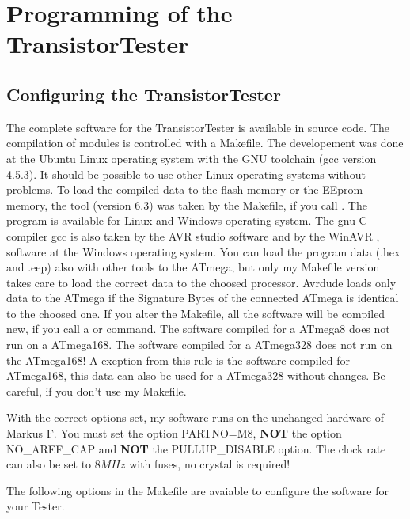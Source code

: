 \chapter{Programming of the TransistorTester}
\section{Configuring the TransistorTester}
\label{sec:config}
The complete software for the TransistorTester is available in source code.
The compilation of modules is controlled with a Makefile. The developement was done
at the Ubuntu Linux operating system with the GNU toolchain (gcc version 4.5.3).
It should be possible to use other Linux operating systems without problems.
To load the compiled data to the flash memory or
the EEprom memory, the tool  (version 6.3) was taken by the Makefile, if you call .
 The program  \cite{avrdude} is available for Linux and Windows operating system.
The gnu C-compiler gcc is also taken by the AVR studio software and
by the WinAVR \cite{winavr1},\cite{winavr2} software at the Windows operating system.
You can load the program data (.hex and .eep) also with other tools to the ATmega,
but only my Makefile version takes care to load the correct data to the choosed processor.
Avrdude loads only data to the ATmega if the Signature Bytes of the connected ATmega is
identical to the choosed one. 
If you alter the Makefile, all the software will be compiled new, if you call a  or
 command. The software compiled for a ATmega8 does not run on a ATmega168.
The software compiled for a ATmega328 does not run on the ATmega168! 
A exeption from this rule is the software compiled for ATmega168, this data can also be used
for a ATmega328 without changes.
Be careful, if you don't use my Makefile.

With the correct options set, my software runs on the unchanged hardware of Markus F.
You must set the option PARTNO=M8, \textbf {NOT} the option NO\_AREF\_CAP and \textbf {NOT} the  PULLUP\_DISABLE option.
The clock rate can also be set to \(8MHz\) with fuses, no crystal is required!


The following options in the Makefile are avaiable to configure the software for your Tester.

